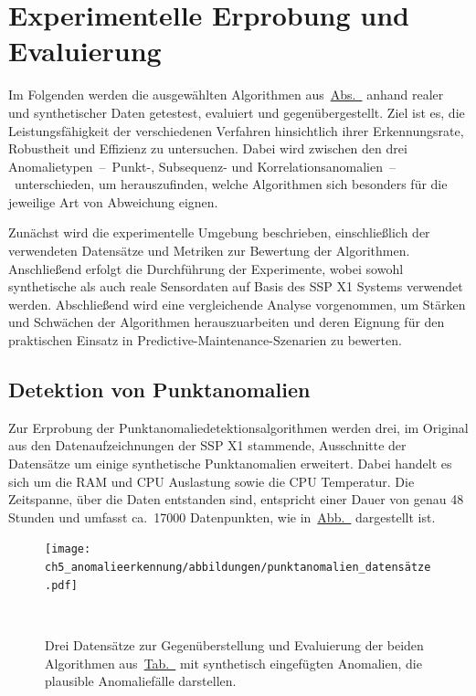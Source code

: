 \chapter{Experimentelle Erprobung und Evaluierung}\label{ch:anomaliedetektion_test}
Im Folgenden werden die ausgewählten Algorithmen aus~\hyperref[sec:algorithmen]{Abs.~} anhand realer und synthetischer
Daten getestest, evaluiert und gegenübergestellt. Ziel ist es, die Leistungsfähigkeit der verschiedenen Verfahren hinsichtlich ihrer
Erkennungsrate, Robustheit und Effizienz zu untersuchen. Dabei wird zwischen den drei Anomalietypen~–~Punkt-, Subsequenz- und
Korrelationsanomalien~–~unterschieden, um herauszufinden, welche Algorithmen sich besonders für die jeweilige Art von Abweichung eignen.

Zunächst wird die experimentelle Umgebung beschrieben, einschließlich der verwendeten Datensätze und Metriken zur Bewertung der Algorithmen.
Anschließend erfolgt die Durchführung der Experimente, wobei sowohl synthetische als auch reale Sensordaten auf Basis des SSP X1 Systems
verwendet werden. Abschließend wird eine vergleichende Analyse vorgenommen, um Stärken und Schwächen der Algorithmen herauszuarbeiten und
deren Eignung für den praktischen Einsatz in Predictive-Maintenance-Szenarien zu bewerten.

\section{Detektion von Punktanomalien}\label{sec:punktanomaliedetektion}
Zur Erprobung der Punktanomaliedetektionsalgorithmen werden drei, im Original aus den Datenaufzeichnungen der SSP X1 stammende, Ausschnitte 
der Datensätze um einige synthetische Punktanomalien erweitert. Dabei handelt es sich um die RAM und CPU Auslastung sowie die CPU Temperatur.
Die Zeitspanne, über die Daten entstanden sind, entspricht einer Dauer von genau 48 Stunden und umfasst ca.~17000 Datenpunkten, wie
in~\hyperref[fig:punktanomalien_testdata]{Abb.~} dargestellt ist.

\begin{figure}[t!]
    \centering
        \texttt{[image: ch5\_anomalieerkennung/abbildungen/punktanomalien\_datensätze.pdf]}
    \caption{\centering Drei Datensätze zur Gegenüberstellung und Evaluierung der beiden Algorithmen
    aus~\hyperref[tab:algorithmen]{Tab.~} mit synthetisch eingefügten Anomalien, die plausible Anomaliefälle darstellen.}
~\label{fig:punktanomalien_testdata}
\end{figure}

